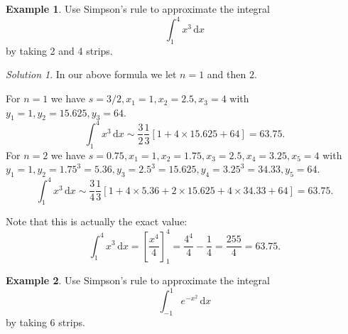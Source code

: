 \documentclass[
  11pt,
  oneside]{book}
\newcommand{\slide}{}
\theoremstyle{definition}
\theoremstyle{definition}
\newtheorem{example}{Example}[chapter]
\theoremstyle{definition}
\theoremstyle{definition}
\theoremstyle{remark}
\newtheorem*{solution}{Solution}
\begin{document}
\slide

\begin{example}
Use Simpson's rule to approximate the integral
\[
\int_1^4x^3\,\mathrm{d}x
\]
by taking 2 and 4 strips.
\end{example}

\begin{solution}
In our above formula we let \(n=1\) and then \(2\).

For \(n=1\) we have \(s=3/2, x_1=1, x_2=2.5, x_3=4\) with \(y_1=1, y_2=15.625, y_3=64\).
\[
\int_1^4x^3\,\mathrm{d}x\sim\frac32\frac13\left[1+4\times15.625+64\right] = 63.75.
\]
For \(n=2\) we have \(s=0.75, x_1=1, x_2=1.75, x_3=2.5, x_4=3.25, x_5=4\) with \(y_1=1, y_2=1.75^3=5.36, y_3 = 2.5^3=15.625, y_4=3.25^3=34.33, y_5=64\).
\[
\int_1^4x^3\,\mathrm{d}x\sim\frac34\frac13\left[1+4\times5.36+2\times15.625+4\times34.33+64\right] = 63.75.
\]

Note that this is actually the exact value:
\[
\int_1^4x^3\,\mathrm{d}x = \left[\frac{x^4}4\right]_1^4 = \frac{4^4}4-\frac14 = \frac{255}4=63.75.
\]
\end{solution}

\slide

\begin{slidesonly}

\hbox{}
\slide
\hbox{}
\slide

\end{slidesonly}

\begin{example}
Use Simpson's rule to approximate the integral
\[
\int_{-1}^1e^{-x^2}\,\mathrm{d}x
\]
by taking 6 strips.
\end{example}
\end{document}
